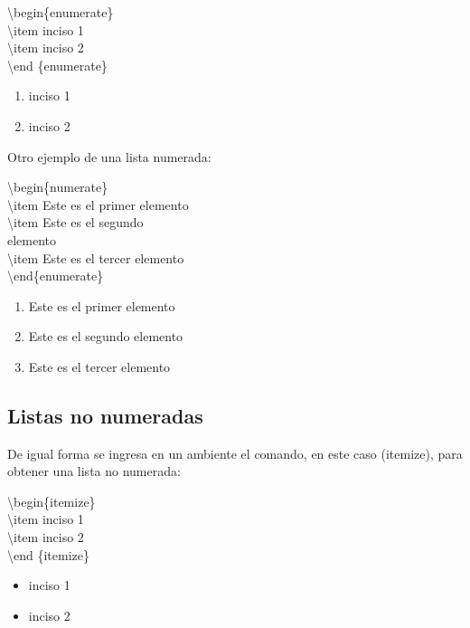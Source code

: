 \documentclass{article}
\begin{document}
\begin{multicols}{2} 
\noindent
\textbackslash begin\{enumerate\}\\	
\textbackslash item inciso 1\\
\textbackslash item inciso 2\\
\textbackslash end \{enumerate\}
\columnbreak
\begin{enumerate}
\item inciso 1\\
\item inciso 2
\end{enumerate}
\end{multicols}

Otro ejemplo de una lista numerada:

\begin{multicols}{2}
\noindent
\textbackslash begin\{numerate\}\\
\textbackslash item Este es el primer elemento\\
\textbackslash item Este es el segundo\\
elemento\\
\textbackslash item Este es el tercer elemento\\
\textbackslash end\{enumerate\}
\columnbreak
\begin{enumerate}
\item Este es el primer elemento
\item Este es el segundo elemento
\item Este es el tercer elemento
\end{enumerate}
\end{multicols}


\subsection{Listas no numeradas}
De igual forma se ingresa en un ambiente el comando, en este caso (itemize), para obtener una lista no numerada:

\begin{multicols}{2} 
\noindent
\textbackslash begin\{itemize\}\\	
\textbackslash item inciso 1\\
\textbackslash item inciso 2\\
\textbackslash end \{itemize\}
\columnbreak
\begin{itemize}
\item inciso 1
\item inciso 2
\end{itemize}
\end{multicols}
\end{document}
